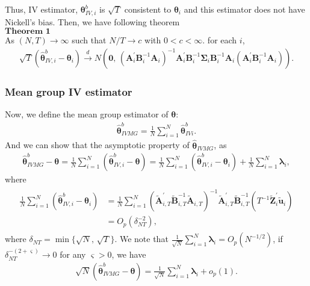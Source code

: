 \documentclass[12pt,a4paper,hyperref]{article}
\begin{document}
Thus, IV  estimator, $\boldsymbol{\theta}^{b}_{IV, i}$ is $\sqrt{T}$ consistent to $\boldsymbol{\theta}_{i}$ and this estimator does not have Nickell's bias. Then, we have following theorem\\
$\mathbf{Theorem \,\,1}$ \\
As $\left(N,T \right)\to \infty $ such that $N/T \to c$ with $0< c< \infty$. for each $i$,
\begin{align}
\sqrt{T}\left(\hat{\boldsymbol{\theta}}^{b}_{IV,i}-\boldsymbol{\theta}_{i}  \right)\overset{d}{\to} N \left(\boldsymbol{0},\,\left(\boldsymbol{A}_{i}^{'}\boldsymbol{B}_{i}^{-1}\boldsymbol{A}_{i} \right)^{-1}\boldsymbol{A}_{i}^{'}\boldsymbol{B}_{i}^{-1}   \boldsymbol{\Sigma}_{i}\boldsymbol{B}_{i}^{-1} \boldsymbol{A}_{i}\left(\boldsymbol{A}_{i}^{'}\boldsymbol{B}_{i}^{-1}\boldsymbol{A}_{i} \right)\right).
\end{align}


\subsubsection{Mean group IV estimator }
Now, we define the mean group estimator of $\boldsymbol{\theta}$:
\begin{align}
\hat{\boldsymbol{\theta}}^{b}_{IVMG}=\frac{1}{N}\sum^{N}_{i=1}\hat{\boldsymbol{\theta}}^{b}_{IVi}.
\end{align}
And we can show that the asymptotic property of $\hat{\boldsymbol{\theta}}_{IVMG}$, as
\begin{align}
\hat{\boldsymbol{\theta}}^{b}_{IVMG}-\boldsymbol{\theta}=\frac{1}{N}\sum^{N}_{i=1}\left(\hat{\boldsymbol{\theta}}^{b}_{IV,i}- \boldsymbol{\theta}\right)=\frac{1}{N}\sum^{N}_{i=1}\left(\hat{\boldsymbol{\theta}}^{b}_{IV,i}- \boldsymbol{\theta}_{i}\right)+\frac{1}{N}\sum^{N}_{i=1}\boldsymbol{\lambda}_{i},
\end{align}
where
\begin{align}
\begin{split}
\frac{1}{N}\sum^{N}_{i=1}\left(\hat{\boldsymbol{\theta}}^{b}_{IV,i}- \boldsymbol{\theta}_{i}\right)&=\frac{1}{N}\sum^{N}_{i=1} \left(\tilde{\boldsymbol{A}}_{i,T}^{'}\tilde{\boldsymbol{B}}_{i,T}^{-1}\tilde{\boldsymbol{A}}_{i,T} \right)^{-1}\tilde{\boldsymbol{A}}_{i,T}^{'}\tilde{\boldsymbol{B}}_{i,T}^{-1}\left(T^{-1}  \tilde{\boldsymbol{Z}}^{'}_{i}\tilde{\boldsymbol{u}}_{i} \right) \\
&= O_{p}\left(\delta^{-2}_{NT} \right),
\end{split}
\end{align}
where $\delta_{NT}=\min \{\sqrt{N},\,\sqrt{T} \}$.
We note that $\frac{1}{\sqrt{N}}\sum^{N}_{i=1}\boldsymbol{\lambda}_{i}=O_{p}\left(N^{-1/2} \right)$, if $\delta_{NT}^{-(2+\varsigma)}\to 0$ for any $\varsigma >0$, we have
\begin{align}
\sqrt{N}\left(\hat{\boldsymbol{\theta}}^{b}_{IVMG}-\boldsymbol{\theta}  \right)=\frac{1}{\sqrt{N}}\sum^{N}_{i=1}\boldsymbol{\lambda}_{i}+o_{p} \left(1 \right).
\end{align}
\end{document}
